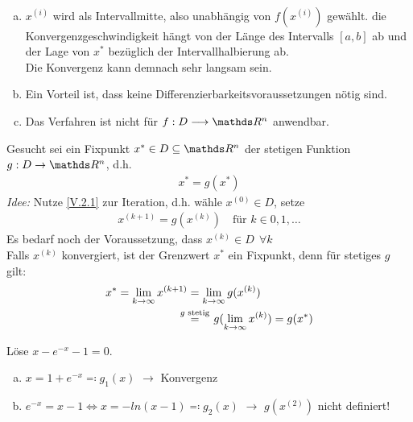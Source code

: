 \begin{Beme}~
	\begin{enumerate}[a)]
		\item $x^{(i)} $ wird als Intervallmitte, also unabhängig von $f(x^{(i)})$
		gewählt. die Konvergenzgeschwindigkeit hängt von der Länge des Intervalls $[a,b]$ ab
		und der Lage von $x^{*}$ bezüglich der Intervallhalbierung ab. \\
		Die Konvergenz kann demnach sehr langsam sein.
		\item Ein Vorteil ist, dass keine Differenzierbarkeitsvoraussetzungen nötig sind.
		\item Das Verfahren ist nicht für $f:D\longrightarrow \R^n$ anwendbar.
	\end{enumerate}
\end{Beme}


Gesucht sei ein Fixpunkt $x^{*}\in D\subseteq \R^n$ der stetigen Funktion
$g:D\rightarrow\R^n$, d.h.
\begin{gather}
x^{*} = g(x^{*}) \label{V.2.1}
\end{gather}
\textit{Idee:}
Nutze \eqref{V.2.1} zur Iteration, d.h. wähle $x^{(0)}\in D$,
setze 
\begin{gather}
x^{(k+1)} = g(x^{(k)})  \quad \text{für } k\in 0, 1, \dotsc
\label{V.2.2}
\end{gather}
Es bedarf noch der Voraussetzung, dass $x^{(k)}\in D~~ \forall k$ \\
Falls $x^{(k)}$ konvergiert, ist der Grenzwert $x^{*}$ ein Fixpunkt,
denn für stetiges $g$ gilt:
\begin{align} \nonumber
x^{*} = \lim_{k\rightarrow \infty}x^{(k+1)} &= \lim_{k\rightarrow \infty}g(x^{(k)}) \\
& \overset{\mathclap{g \text{ stetig}} }{=}\quad g(\lim_{k\rightarrow \infty}x^{(k)}) = g(x^{*})
\label{V.2.3}
\end{align}

\begin{Bspe}
	Löse $x-e^{-x}-1 = 0$.
	\begin{enumerate}[a)]
		\item $x=1+e^{-x} \eqqcolon g_1(x)$
		\label{im5.2.1(1)}
		$\longrightarrow$ Konvergenz
		\item $e^{-x} = x-1   \Leftrightarrow x= -ln(x-1) \eqqcolon g_2(x)$
		\label{im5.2.1(2)}
		$\longrightarrow$ $g(x^{(2)}) $ nicht definiert!
	\end{enumerate}
\end{Bspe}

